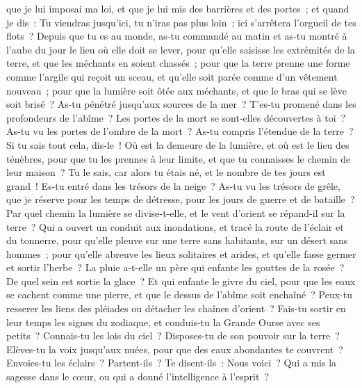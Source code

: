 \begin{multicols}{2}
que je lui imposai ma loi, et que je lui mis des barrières et des portes~;
 et quand je dis~: Tu viendras jusqu'ici, tu n'iras pas plus loin~; ici s'arrêtera l'orgueil de tes flots~?
Depuis que tu es au monde, as-tu commandé au matin et as-tu montré à l'aube du jour le lieu où elle doit se lever,
pour qu'elle saisisse les extrémités de la terre, et que les méchants en soient chassés~;
pour que la terre prenne une forme comme l'argile qui reçoit un sceau, et qu'elle soit parée comme d'un vêtement nouveau~;
pour que la lumière soit ôtée aux méchants, et que le bras qui se lève soit brisé~?
As-tu pénétré jusqu'aux sources de la mer~? T'es-tu promené dans les profondeurs de l'abîme~?
Les portes de la mort se sont-elles découvertes à toi~? As-tu vu les portes de l'ombre de la mort~?
As-tu compris l'étendue de la terre~? Si tu sais tout cela, dis-le~!
Où est la demeure de la lumière, et où est le lieu des ténèbres,
pour que tu les prennes à leur limite, et que tu connaisses le chemin de leur maison~?
Tu le sais, car alors tu étais né, et le nombre de tes jours est grand~!
Es-tu entré dans les trésors de la neige~? As-tu vu les trésors de grêle,
que je réserve pour les temps de détresse, pour les jours de guerre et de bataille~?
Par quel chemin la lumière se divise-t-elle, et le vent d'orient se répand-il sur la terre~?
Qui a ouvert un conduit aux inondations, et tracé la route de l'éclair et du tonnerre,
pour qu'elle pleuve sur une terre sans habitants, sur un désert sans hommes~;
pour qu'elle abreuve les lieux solitaires et arides, et qu'elle fasse germer et sortir l'herbe~?
La pluie a-t-elle un père qui enfante les gouttes de la rosée~?
De quel sein est sortie la glace~? Et qui enfante le givre du ciel,
pour que les eaux se cachent comme une pierre, et que le dessus de l'abîme soit enchaîné~?
Peux-tu resserer les liens des pléiades ou détacher les chaînes d'orient~?
Fais-tu sortir en leur temps les signes du zodiaque, et conduis-tu la Grande Ourse avec ses petits~?
Connais-tu les lois du ciel~? Disposes-tu de son pouvoir sur la terre~?
Elèves-tu la voix jusqu'aux nuées, pour que des eaux abondantes te couvrent~?
Envoies-tu les éclairs~? Partent-ils~? Te disent-ils~: Nous voici~?
Qui a mis la sagesse dans le cœur, ou qui a donné l'intelligence à l'esprit~?

\end{multicols}
